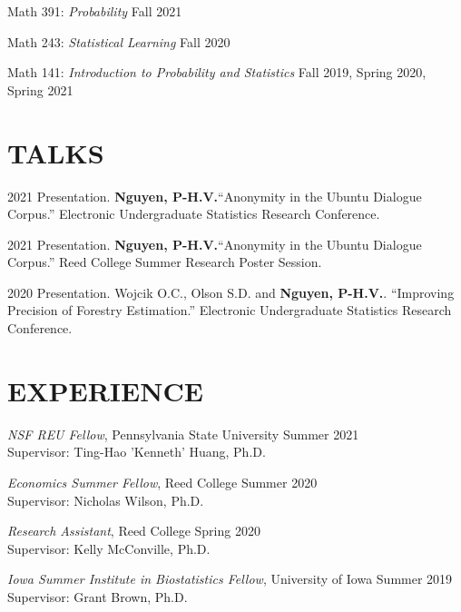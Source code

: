 \documentclass[margin]{res}
\def\pvn{\textbf{Nguyen, P-H.V.}}
\begin{document}
\begin{resume}
Math 391: {\it Probability} \hfill Fall 2021

Math 243: {\it Statistical Learning} \hfill Fall 2020

Math 141: {\it Introduction to Probability and Statistics} \hfill Fall 2019, Spring 2020, Spring 2021


\section{TALKS}

2021 Presentation. \pvn “Anonymity in the Ubuntu Dialogue Corpus.” Electronic Undergraduate Statistics Research Conference.

2021 Presentation. \pvn “Anonymity in the Ubuntu Dialogue Corpus.” Reed College Summer Research Poster Session.

2020 Presentation. Wojcik O.C., Olson S.D. and \pvn. “Improving Precision of Forestry Estimation.” Electronic Undergraduate Statistics Research Conference.

\section{EXPERIENCE}

\emph{NSF REU Fellow}, Pennsylvania State University \hfill Summer 2021 \\
Supervisor: Ting-Hao 'Kenneth' Huang, Ph.D.

\emph{Economics Summer Fellow}, Reed College \hfill Summer 2020 \\
Supervisor: Nicholas Wilson, Ph.D.

\emph{Research Assistant}, Reed College \hfill Spring 2020 \\
Supervisor: Kelly McConville, Ph.D.

\emph{Iowa Summer Institute in Biostatistics Fellow}, University of Iowa \hfill Summer 2019 \\
Supervisor: Grant Brown, Ph.D.


\end{resume} 
\end{document}
